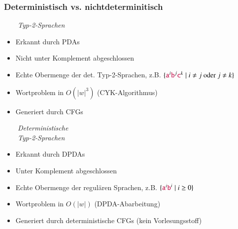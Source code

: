 \documentclass[onlymath]{beamer}
\begin{document}
\begin{frame}[t]\frametitle{Deterministisch vs. nichtdeterminitisch}

\begin{minipage}[t]{4.7cm}
~~~~\emph{Typ-2-Sprachen}\\
\begin{itemize}
\item Erkannt durch PDAs
\item Nicht unter Komplement abgeschlossen
\item Echte Obermenge der det. Typ-2-Sprachen, z.B. $\{\mathtt{\textcolor{purple}{a}}^i\mathtt{\textcolor{purple}{b}}^j\mathtt{\textcolor{purple}{c}}^k\mid i\neq j \text{ oder }j\neq k\}$
\item Wortproblem in $O(|w|^3)$ (CYK-Algorithmus)
\item Generiert durch CFGs
\end{itemize}
\end{minipage}
\begin{minipage}[t]{4.7cm}
~~~~\emph{Deterministische}\\
\mbox{}~~~~\emph{Typ-2-Sprachen}
\begin{itemize}
\item Erkannt durch DPDAs
\item Unter Komplement abgeschlossen
\item Echte Obermenge der regulären Sprachen, z.B. $\{\mathtt{\textcolor{purple}{a}}^i\mathtt{\textcolor{purple}{b}}^i\mid i\geq 0\}$
\item Wortproblem in $O(|w|)$ (DPDA-Abarbeitung)
\item Generiert durch deterministische CFGs (kein Vorlesungsstoff)
\end{itemize}
\end{minipage}

\end{frame}

\end{document}

